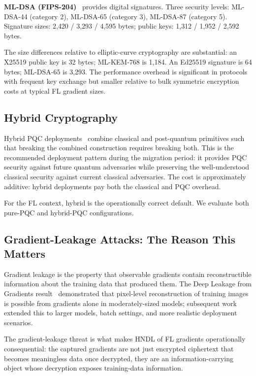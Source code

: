 \documentclass[sigconf,nonacm]{acmart}
\begin{document}
\textbf{ML-DSA (FIPS-204)}~\cite{nist2024fips204} provides digital
signatures. Three security levels: ML-DSA-44 (category 2), ML-DSA-65
(category 3), ML-DSA-87 (category 5). Signature sizes: 2{,}420 /
3{,}293 / 4{,}595 bytes; public keys: 1{,}312 / 1{,}952 / 2{,}592
bytes.

The size differences relative to elliptic-curve cryptography are
substantial: an X25519 public key is 32 bytes; ML-KEM-768 is 1{,}184.
An Ed25519 signature is 64 bytes; ML-DSA-65 is 3{,}293. The
performance overhead is significant in protocols with frequent key
exchange but smaller relative to bulk symmetric encryption costs at
typical FL gradient sizes.

\subsection{Hybrid Cryptography}

Hybrid PQC deployments~\cite{rfc9180,stebila2024hybridkex} combine
classical and post-quantum primitives such that breaking the
combined construction requires breaking both. This is the
recommended deployment pattern during the migration period: it
provides PQC security against future quantum adversaries while
preserving the well-understood classical security against current
classical adversaries. The cost is approximately additive: hybrid
deployments pay both the classical and PQC overhead.

For the FL context, hybrid is the operationally correct default.
We evaluate both pure-PQC and hybrid-PQC configurations.

\subsection{Gradient-Leakage Attacks: The Reason This Matters}

Gradient leakage is the property that observable gradients
contain reconstructible information about the training data that
produced them. The Deep Leakage from Gradients
result~\cite{zhu2019dlg} demonstrated that pixel-level reconstruction
of training images is possible from gradients alone in moderately-sized
models; subsequent work~\cite{geiping2020inverting,yin2024leakage}
extended this to larger models, batch settings, and more realistic
deployment scenarios.

The gradient-leakage threat is what makes HNDL of FL gradients
operationally consequential: the captured gradients are not just
encrypted ciphertext that becomes meaningless data once decrypted,
they are an information-carrying object whose decryption exposes
training-data information.
\end{document}
